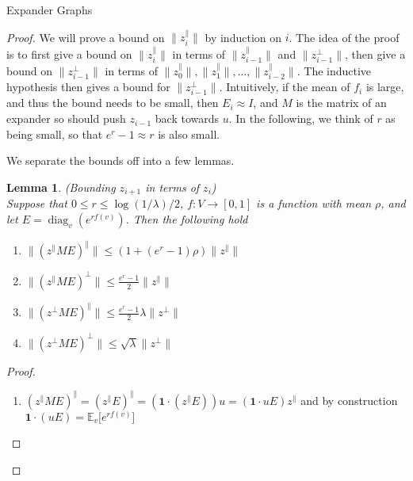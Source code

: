 \documentclass{article}
\newcommand{\E}{\mathbb E}
\DeclareMathOperator{\diag}{diag}
\newtheorem{lemma}{Lemma}
\begin{document}
\begin{section}{Expander Graphs}
\begin{proof}
    We will prove a bound on $\lVert z_i^\parallel\rVert$ by induction on $i$.
    The idea of the proof is to first give a bound on $\lVert z_i^\parallel\rVert$ in terms of $\lVert z_{i-1}^\parallel \rVert$ and $\lVert z_{i-1}^\perp \rVert$, then give a bound on $\lVert z_{i-1}^\perp \rVert$ in terms of $\lVert z_0^\parallel \rVert, \lVert z_1^\parallel \rVert, \ldots, \lVert z_{i-2}^\parallel\rVert$.
    The inductive hypothesis then gives a bound for $\lVert z_{i-1}^\perp \rVert$.
    Intuitively, if the mean of $f_i$ is large, and thus the bound needs to be small, then $E_i \approx I$, and $M$ is the matrix of an expander so should push $z_{i-1}$ back towards $u$.
    In the following, we think of $r$ as being small, so that $e^r - 1 \approx r$ is also small.

    We separate the bounds off into a few lemmas.
    \begin{lemma}{(Bounding $z_{i+1}$ in terms of $z_i$)\\}
      Suppose that $0 \leq r \leq \log(1/\lambda)/2$, $f : V \to [0,1]$ is a function with mean $\rho$, and let $E = \diag_v(e^{rf(v)})$.
      Then the following hold
      \begin{enumerate}
	\item
	  $
	  \lVert (z^\parallel ME)^\parallel \rVert \leq (1 + (e^r - 1)\rho)\lVert z^\parallel \rVert
	  $
	\item
	  $
	  \lVert (z^\parallel M E)^\perp\rVert \leq \frac{e^r - 1}{2} \lVert z^\parallel \rVert
	  $
	\item
	  $
	  \lVert (z^\perp M E)^\parallel \rVert \leq \frac{e^r - 1}{2} \lambda \lVert z^\perp \rVert
	  $
	\item
	  $
	  \lVert (z^\perp M E)^\perp \rVert \leq \sqrt{\lambda} \lVert z^\perp \rVert
	  $
      \end{enumerate}
    \end{lemma}
    \begin{proof}
      \begin{enumerate}
	\item
	  $(z^\parallel ME)^\parallel = (z^\parallel E)^\parallel = (\mathbf 1 \cdot (z^\parallel E))u = (\mathbf 1 \cdot uE)z^\parallel$
	  and by construction $\mathbf 1 \cdot (uE) = \E_v\big[e^{rf(v)}\big]$


\end{enumerate}
\end{proof}
\end{proof}
\end{section}
\end{document}
